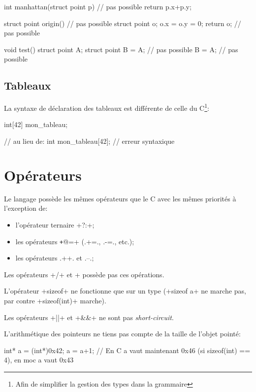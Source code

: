 \documentclass[a4paper]{article}
\begin{document}
      \begin{moc}
int manhattan(struct point p) { // pas possible
    return p.x+p.y;
}

struct point origin() { // pas possible
    struct point o;
    o.x = o.y = 0;
    return o; // pas possible
}

void test() {
    struct point A;
    struct point B = A; // pas possible
    B = A; // pas possible
}
      \end{moc}

    \subsection{Tableaux}
      La syntaxe de déclaration des tableaux est différente de celle du
      C\footnote{Afin de simplifier la gestion des types dans la grammaire}:
      \begin{moc}
int[42] mon_tableau;

// au lieu de:
int mon_tableau[42]; // erreur syntaxique
      \end{moc}

  \section{Opérateurs}
    Le langage possède les mêmes opérateurs que le C avec les mêmes priorités à
    l'exception de:
    \begin{itemize}
      \item l'opérateur ternaire \imoc+?:+;
      \item les opérateurs \texttt+@=+ (\imoc.+=., \imoc.-=., etc.);
      \item les opérateurs \imoc.++. et \imoc.--.;
    \end{itemize}

    Les opérateurs \imoc+/+ et \imoc+%
    possède pas ces opérations.

    L'opérateur \imoc+sizeof+ ne fonctionne que sur un type (\imoc+sizeof a+ ne
    marche pas, par contre \imoc+sizeof(int)+ marche).

    Les opérateurs \imoc+||+ et \imoc+&&+ ne sont pas \emph{short-circuit}.

    L'arithmétique des pointeurs ne tiens pas compte de la taille de l'objet
    pointé:
    \begin{moc}
int* a = (int*)0x42;
a = a+1;
// En C a vaut maintenant 0x46 (si sizeof(int) == 4), en moc a vaut 0x43
    \end{moc}
\end{document}
